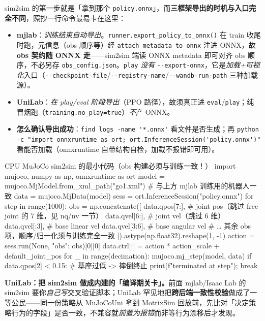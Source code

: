 \begin{note}
sim2sim 的第一步就是「拿到那个 \verb|policy.onnx|」，而\textbf{三框架导出的时机与入口完全不同}，照抄一行命令最易卡在这里：
\begin{itemize}
  \item \textbf{mjlab}：\emph{训练结束自动导出}。\verb|runner.export_policy_to_onnx()| 在 train 收尾时跑，元信息（obs 顺序等）经 \verb|attach_metadata_to_onnx| 注进 ONNX，故\textbf{obs 契约随 ONNX 走}——sim2sim 端读 ONNX metadata 即可对齐 obs 顺序，不必另存 \verb|obs_config.json|。\verb|play| \emph{没有} \verb|--export-onnx|，它是\emph{加载+可视化}入口（\verb|--checkpoint-file|/\verb|--registry-name|/\verb|--wandb-run-path| 三种加载源）。
  \item \textbf{UniLab}：\emph{在 play/eval 阶段导出}（PPO 路径），故须真正进 \verb|eval|/\verb|play|；纯冒烟跑（\verb|training.no_play=true|）\emph{不}产 ONNX。
  \item \textbf{怎么确认导出成功}：\verb|find logs -name '*.onnx'| 看文件是否生成；再 \verb|python -c "import onnxruntime as ort; ort.InferenceSession('policy.onnx')"| 看能否加载（onnxruntime 自带结构自检，加载不报错即可用）。
\end{itemize}
\end{note}

\begin{codebox}[Python]{CPU MuJoCo sim2sim 的最小代码（obs 构建必须与训练一致！）}
import mujoco, numpy as np, onnxruntime as ort
model = mujoco.MjModel.from_xml_path("go1.xml")   # 与上方 mjlab 训练用的机器人一致
data  = mujoco.MjData(model)
sess  = ort.InferenceSession("policy.onnx")
for step in range(1000):
    obs = np.concatenate([
        data.qpos[7:],   # joint pos（跳过 free joint 的 7 维，见 nq/nv 一节）
        data.qvel[6:],   # joint vel（跳过 6 维）
        data.qvel[:3],   # base linear vel
        data.qvel[3:6],  # base angular vel
        # … 其余 obs 项，顺序/归一化须与训练完全一致
    ]).astype(np.float32).reshape(1, -1)
    action = sess.run(None, {"obs": obs})[0][0]
    data.ctrl[:] = action * action_scale + default_joint_pos
    for _ in range(decimation):
        mujoco.mj_step(model, data)
    if data.qpos[2] < 0.15:           # 基座过低 -> 摔倒终止
        print(f"terminated at {step}"); break
\end{codebox}

\textbf{UniLab：把 sim2sim 做成内建的「编译期关卡」。}前面 mjlab/Isaac Lab 的 sim2sim 要你\emph{自己写}交叉验证脚本；UniLab 罕见地把\textbf{跨后端一致性校验}做成了一等公民——同一份策略从 MuJoCoUni 拿到 MotrixSim 回放前，先比对「决定策略行为的字段」是否一致，不兼容就\emph{前置为报错}而非等行为漂移后才发现。

